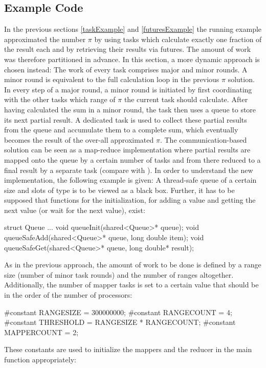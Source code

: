 \subsection{Example Code}
\label{sharedMemoryExample}
In the previous sections \ref{taskExample} and \ref{futuresExample} the running example approximated the number $\pi$ by using tasks which calculate exactly one fraction of the result each and by retrieving their results via futures. The amount of work was therefore partitioned in advance. In this section, a more dynamic approach is chosen instead: The work of every task comprises major and minor rounds. A minor round is equivalent to the full calculation loop in the previous $\pi$ solution. In every step of a major round, a minor round is initiated by first coordinating with the other tasks which range of $\pi$ the current task should calculate. After having calculated the sum in a minor round, the task then uses a queue to store its next partial result. A dedicated task is used to collect these partial results from the queue and accumulate them to a complete sum, which eventually becomes the result of the over-all approximated $\pi$. The communication-based solution can be seen as a map-reduce implementation where partial results are mapped onto the queue by a certain number of tasks and from there reduced to a final result by a separate task (compare with \cite{MapReduce}).
In order to understand the new implementation, the following example is given: A thread-safe queue of a certain size and slots of type  is to be viewed as a black box. Further, it has to be supposed that functions for the initialization, for adding a value and getting the next value (or wait for the next value), exist:
\begin{ccode}
struct Queue {...}
void queueInit(shared<Queue>* queue);
void queueSafeAdd(shared<Queue>* queue, long double item);
void queueSafeGet(shared<Queue>* queue, long double* result);
\end{ccode}
As in the previous approach, the amount of work to be done is defined by a range size (number of minor task rounds) and the number of ranges altogether. Additionally, the number of mapper tasks is set to a certain value that should be in the order of the number of processors:
\begin{ccode}
#constant RANGESIZE = 300000000; 
#constant RANGECOUNT = 4; 
#constant THRESHOLD = RANGESIZE * RANGECOUNT; 
#constant MAPPERCOUNT = 2;
\end{ccode}
These constants are used to initialize the mappers and the reducer in the main function appropriately:
